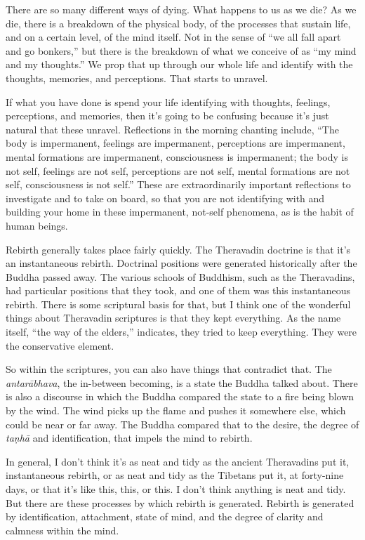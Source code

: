 There are so many different ways of dying. What happens to us as we die?
As we die, there is a breakdown of the physical body, of the processes
that sustain life, and on a certain level, of the mind itself. Not in
the sense of “we all fall apart and go bonkers,” but there is the
breakdown of what we conceive of as “my mind and my thoughts.” We prop
that up through our whole life and identify with the thoughts, memories,
and perceptions. That starts to unravel.

If what you have done is spend your life identifying with thoughts,
feelings, perceptions, and memories, then it’s going to be confusing
because it’s just natural that these unravel. Reflections in the morning
chanting include, “The body is impermanent, feelings are impermanent,
perceptions are impermanent, mental formations are impermanent,
consciousness is impermanent; the body is not self, feelings are not
self, perceptions are not self, mental formations are not self,
consciousness is not self.” These are extraordinarily important
reflections to investigate and to take on board, so that you are not
identifying with and building your home in these impermanent, not-self
phenomena, as is the habit of human beings.

Rebirth generally takes place fairly quickly. The Theravadin doctrine is
that it’s an instantaneous rebirth. Doctrinal positions were generated
historically after the Buddha passed away. The various schools of
Buddhism, such as the Theravadins, had particular positions that they
took, and one of them was this instantaneous rebirth. There is some
scriptural basis for that, but I think one of the wonderful things about
Theravadin scriptures is that they kept everything. As the name itself,
“the way of the elders,” indicates, they tried to keep everything. They
were the conservative element.

So within the scriptures, you can also have things that contradict that.
The \emph{antarābhava}, the in-between becoming, is a state the Buddha
talked about. There is also a discourse in which the Buddha compared the
state to a fire being blown by the wind. The wind picks up the flame and
pushes it somewhere else, which could be near or far away. The Buddha
compared that to the desire, the degree of \emph{taṇhā} and
identification, that impels the mind to rebirth.

In general, I don’t think it’s as neat and tidy as the ancient
Theravadins put it, instantaneous rebirth, or as neat and tidy as the
Tibetans put it, at forty-nine days, or that it’s like this, this, or
this. I don’t think anything is neat and tidy. But there are these
processes by which rebirth is generated. Rebirth is generated by
identification, attachment, state of mind, and the degree of clarity and
calmness within the mind.

